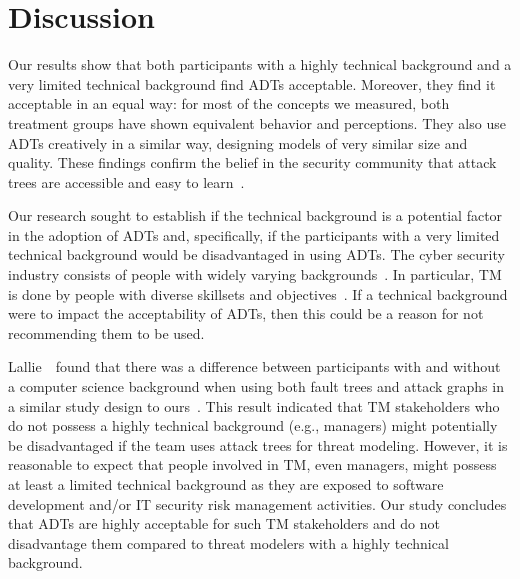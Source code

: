 \section{Discussion}\label{sec:discussion}

Our results show that both participants with a highly technical background and a very limited technical background find ADTs acceptable. Moreover, they find it acceptable in an equal way: for most of the concepts we measured, both treatment groups have shown equivalent behavior and perceptions. They also use ADTs creatively in a similar way, designing models of very similar size and quality. These findings confirm the belief in the security community that attack trees are accessible and easy to learn~\cite{reversinglabs2024attacktrees}. 

Our research sought to establish if the technical background is a potential factor in the adoption of ADTs and, specifically, if the participants with a very limited technical background would be disadvantaged in using ADTs. The cyber security industry consists of people with widely varying backgrounds~\cite{andersonSecurityEngineeringGuide2020}. In particular, TM is done by people with diverse skillsets and objectives~\cite{shostack2008experiences,verreydt2024threat}. If a technical background were to impact the acceptability of ADTs, then this could be a reason for not recommending them to be used.


Lallie~\etal\ found that there was a difference between participants with and without a computer science background when using both fault trees and attack graphs in a similar study design to ours~\cite{lallieEmpiricalEvaluationEffectiveness2017}. This result indicated that TM stakeholders who do not possess a highly technical background (e.g., managers) might potentially be disadvantaged if the team uses attack trees for threat modeling. However, it is reasonable to expect that people involved in TM, even managers, might possess at least a limited technical background as they are exposed to software development and/or IT security risk management activities. Our study concludes that ADTs are highly acceptable for such TM stakeholders and do not disadvantage them compared to threat modelers with a highly technical background. 


